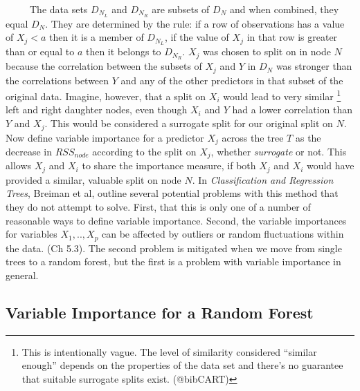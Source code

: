 \documentclass[12pt,twoside]{reedthesis}
\begin{document}
  ~~~~~The data sets \(D_{N_L}\) and \(D_{N_R}\) are subsets of \(D_N\)
  and when combined, they equal \(D_N\). They are determined by the rule:
  if a row of observations has a value of \(X_j < a\) then it is a member
  of \(D_{N_L}\), if the value of \(X_j\) in that row is greater than or
  equal to \(a\) then it belongs to \(D_{N_R}\). \(X_j\) was chosen to
  split on in node \(N\) because the correlation between the subsets of
  \(X_j\) and \(Y\) in \(D_N\) was stronger than the correlations between
  \(Y\) and any of the other predictors in that subset of the original
  data. Imagine, however, that a split on \(X_i\) would lead to very
  similar \footnote{This is intentionally vague. The level of similarity
    considered ``similar enough'' depends on the properties of the data
    set and there's no guarantee that suitable surrogate splits exist.
    (@bibCART)} left and right daughter nodes, even though \(X_i\) and
  \(Y\) had a lower correlation than \(Y\) and \(X_j\). This would be
  considered a surrogate split for our original split on \(N\). Now define
  variable importance for a predictor \(X_j\) across the tree \(T\) as the
  decrease in \(RSS_{node}\) according to the split on \(X_j\), whether
  \emph{surrogate} or not. This allows \(X_j\) and \(X_i\) to share the
  importance measure, if both \(X_j\) and \(X_i\) would have provided a
  similar, valuable split on node \(N\). In \emph{Classification and
  Regression Trees}, Breiman et al, outline several potential problems
  with this method that they do not attempt to solve. First, that this is
  only one of a number of reasonable ways to define variable importance.
  Second, the variable importances for variables \(X_1,..,X_p\) can be
  affected by outliers or random fluctuations within the data. (Ch 5.3).
  The second problem is mitigated when we move from single trees to a
  random forest, but the first is a problem with variable importance in
  general.
  
  \subsection{Variable Importance for a Random
  Forest}\label{variable-importance-for-a-random-forest}
  
\end{document}
